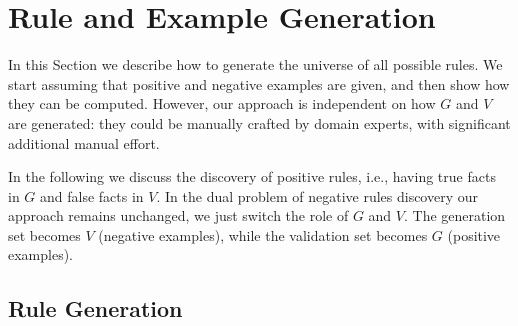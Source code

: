 \section{Rule and Example Generation} \label{sec:rules_gen}
In this Section we describe how to generate the universe of all possible rules. 
We start assuming that positive and negative examples are given, and then show how they can be computed. However, our approach is independent on how $G$ and $V$ are generated: they could be manually crafted by domain experts, with significant additional manual effort.

In the following we discuss the discovery of positive rules, i.e., having true facts in $G$ and false facts in $V$.
In the dual problem of negative rules discovery our approach remains unchanged, we just switch the role of $G$ and $V$. The generation set becomes $V$ (negative examples), while the validation set becomes $G$ (positive examples). 


\vspace{-1ex}	
\subsection{Rule Generation} \label{sec:rules_generation}
\vspace{-1ex}	

